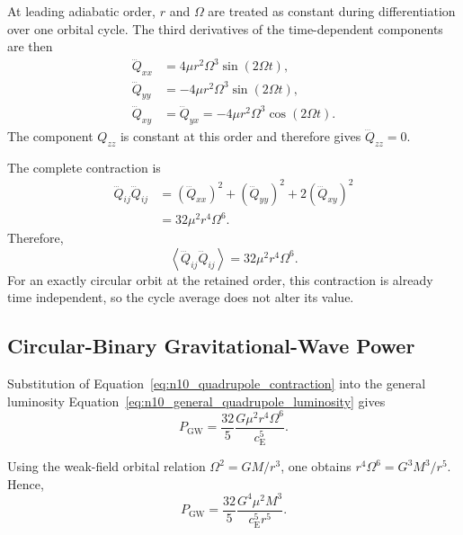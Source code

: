 At leading adiabatic order, $r$ and $\Omega$ are treated as constant during differentiation over one orbital cycle. The third derivatives of the time-dependent components are then
\begin{align}
    \dddot{Q}_{xx} &= 4\mu r^{2}\Omega^{3} \sin(2\Omega t), \\
    \dddot{Q}_{yy} &= - 4\mu r^{2}\Omega^{3} \sin(2\Omega t), \\
    \dddot{Q}_{xy} &= \dddot{Q}_{yx} = - 4\mu r^{2}\Omega^{3} \cos(2\Omega t).
\end{align}
The component $Q_{zz}$ is constant at this order and therefore gives $\dddot{Q}_{zz} = 0$.

The complete contraction is
\begin{equation}
    \begin{aligned}
        \dddot{Q}_{ij} \dddot{Q}_{ij} &= \left( \dddot{Q}_{xx} \right)^{2} + \left( \dddot{Q}_{yy} \right)^{2} + 2 \left( \dddot{Q}_{xy} \right)^{2} \\
        &= 32 \mu^{2} r^{4} \Omega^{6}.
    \end{aligned}
\end{equation}
Therefore,
\begin{equation}
    \left\langle \dddot{Q}_{ij} \dddot{Q}_{ij} \right\rangle = 32 \mu^{2} r^{4} \Omega^{6}.
    \label{eq:n10_quadrupole_contraction}
\end{equation}
For an exactly circular orbit at the retained order, this contraction is already time independent, so the cycle average does not alter its value.

\subsection{Circular-Binary Gravitational-Wave Power}
\label{subsec:n10_binary_power}

Substitution of Equation~\eqref{eq:n10_quadrupole_contraction} into the general luminosity Equation~\eqref{eq:n10_general_quadrupole_luminosity} gives
\begin{equation}
    P_{\mathrm{GW}} = \frac{32}{5} \frac{ G\mu^{2}r^{4}\Omega^{6} }{ c_{\mathrm{E}}^{5} }.
    \label{eq:n10_binary_power_omega_r}
\end{equation}

Using the weak-field orbital relation $\Omega^{2} = GM/r^{3}$, one obtains $r^{4}\Omega^{6} = G^{3}M^{3}/r^{5}$. Hence,
\begin{equation}
    P_{\mathrm{GW}} = \frac{32}{5} \frac{ G^{4}\mu^{2}M^{3} }{ c_{\mathrm{E}}^{5}r^{5} }.
    \label{eq:n10_binary_power_separation}
\end{equation}

